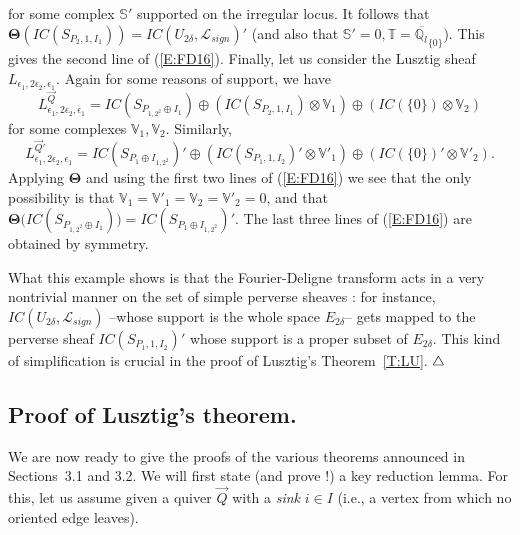 \documentclass[a4paper,10pt]{amsart}
\def\endexample{$\hfill \triangle$}
\def\endexample{$\hfill \triangle$}
\def\qlb{\overline{\mathbb{Q}_l}}
\def\FD{\boldsymbol{\Theta}}
\numberwithin{equation}{section}
\begin{document}
for some complex $\mathbb{S}'$ supported on the irregular locus. It follows that $\FD(IC(S_{P_2,1,I_1})) = IC(U_{2\delta},\mathcal{L}_{sign})'$ (and also that $\mathbb{S}'=0, \mathbb{T}=\qlb_{\{0\}}$). This gives the second line of (\ref{E:FD16}). Finally, let us consider the Lusztig sheaf $L_{\epsilon_1,2\epsilon_2,\epsilon_1}$. Again for some reasons of support, we have
$$L^{\vec{Q}}_{\epsilon_1,2\epsilon_2,\epsilon_1}=IC(S_{P_{1,2^2} \oplus I_1}) \oplus (IC(S_{P_2,1,I_1}) \otimes \mathbb{V}_1) \oplus (IC(\{0\}) \otimes \mathbb{V}_2)$$
for some complexes $\mathbb{V}_1, \mathbb{V}_2$. Similarly,
$$L^{\vec{Q}'}_{\epsilon_1,2\epsilon_2,\epsilon_1}=IC(S_{P_{1} \oplus I_{1,2^2}})' \oplus (IC(S_{P_1,1,I_2})' \otimes \mathbb{V}'_1) \oplus (IC(\{0\})' \otimes \mathbb{V}'_2).$$
Applying $\FD$ and using the first two lines of (\ref{E:FD16}) we see that the only possibility is that $\mathbb{V}_1=\mathbb{V}'_1=\mathbb{V}_2=\mathbb{V}'_2=0$, and that $\FD\big(IC(S_{P_{1,2^2} \oplus I_1})\big)=IC(S_{P_1 \oplus I_{1,2^2}})'$. The last three lines of (\ref{E:FD16}) are obtained by symmetry.

\vspace{.1in}

What this example shows is that the Fourier-Deligne transform acts in a very nontrivial manner on the set of simple perverse sheaves : for instance, $IC(U_{2\delta},\mathcal{L}_{sign})$ --whose support is the whole space $E_{2\delta}$-- gets mapped to the perverse sheaf $IC(S_{P_1,1,I_2})'$ whose support is a proper subset of $E_{2\delta}$. This kind of simplification is crucial in the proof of Lusztig's Theorem~\ref{T:LU}.
\endexample

\vspace{.3in}

\subsection{Proof of Lusztig's theorem.}


\vspace{.15in}

We are now ready to give the proofs of the various theorems announced in Sections~3.1 and 3.2. We will first state (and prove !) a key reduction lemma. For this, let us assume given a quiver $\vec{Q}$ with a \textit{sink} $i \in I$ (i.e., a vertex from which no oriented edge leaves). 
\end{document}
